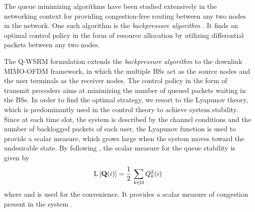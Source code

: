 The queue minimizing algorithms have been studied extensively in the networking context for providing congestion-free routing between any two nodes in the network. One such algorithm is the \emph{backpressure algorithm} \cite{georgiadis2006resource,neely2010stochastic}. It finds an optimal control policy in the form of resource allocation by utilizing differential packets between any two nodes. %

The \ac{Q-WSRM} formulation extends the \emph{backpressure algorithm} to the downlink \ac{MIMO}-\ac{OFDM} framework, in which the multiple \acp{BS} act as the source nodes and the user terminals as the receiver nodes. The control policy in the form of transmit precoders aims at minimizing the number of queued packets waiting in the \acp{BS}. In order to find the optimal strategy, we resort to the Lyapunov theory, which is predominantly used in the control theory to achieve system stability. Since at each time slot, the system is described by the channel conditions and the number of backlogged packets of each user, the Lyapunov function is used to provide a scalar measure, which grows large when the system moves toward the undesirable state. By following \cite{neely2010stochastic}, the scalar measure for the queue stability is given by
\begin{equation}
\mathrm{L}\left [ \mathbf{Q}(i) \right ] = \frac{1}{2} \, \sum_{k \in \mathcal{U}} Q_k^2(i)
\end{equation}
where  and  is used for the convenience. It provides a scalar measure of congestion present in the system \cite[Ch. 3]{neely2010stochastic}. 

